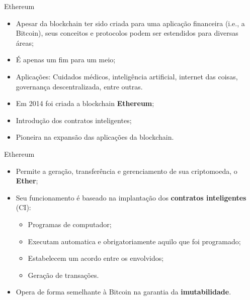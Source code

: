 \begin{frame}{Ethereum}
    \begin{block}{}
    \begin{itemize}
        \item Apesar da blockchain ter sido criada para uma aplicação financeira (i.e., a Bitcoin), seus conceitos e protocolos podem ser estendidos para diversas áreas;
        \item É apenas um fim para um meio;
        \item Aplicações: Cuidados médicos, inteligência artificial, internet das coisas, governança descentralizada, entre outras.
    \end{itemize}
    \end{block}
    \begin{block}{}
    \begin{itemize}
        \item Em 2014 foi criada a blockchain \textbf{Ethereum};
        \item Introdução dos contratos inteligentes;
        \item Pioneira na expansão das aplicações da blockchain.
    \end{itemize}
    \end{block}
\end{frame}

\begin{frame}{Ethereum}
    \begin{itemize}
        \item Permite a geração, transferência e gerenciamento de sua criptomoeda, o \textbf{Ether};
        \item Seu funcionamento é baseado na implantação dos \textbf{contratos inteligentes} (CI):
        \begin{itemize}
            \item Programas de computador;
            \item Executam automatica e obrigatoriamente aquilo que foi programado;
            \item Estabelecem um acordo entre os envolvidos;
            \item Geração de transações.
        \end{itemize}
	    \item Opera de forma semelhante à Bitcoin na garantia da \textbf{imutabilidade}.
    \end{itemize}
\end{frame} 


